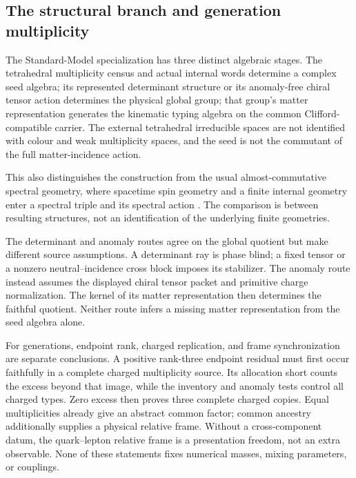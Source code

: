 \documentclass[11pt]{article}
\numberwithin{equation}{section}
\theoremstyle{definition}
\theoremstyle{remark}
\begin{document}
\subsection{The structural branch and generation multiplicity}

The Standard-Model specialization has three distinct algebraic stages.
The tetrahedral multiplicity census and actual internal words determine a
complex seed algebra; its represented determinant structure or its anomaly-free
chiral tensor action determines the physical global group; that group's
matter representation generates the kinematic typing algebra on the common
Clifford-compatible carrier.  The external tetrahedral irreducible spaces
are not identified with colour and weak multiplicity spaces, and the seed
is not the commutant of the full matter-incidence action.

This also distinguishes the construction from the usual almost-commutative
spectral geometry, where spacetime spin geometry and a finite internal
geometry enter a spectral triple and its spectral action
\cite{ConnesGravityMatter1996,ChamseddineConnes1997,
ChamseddineConnesMarcolli2007,ChamseddineConnes2008,
vanDenDungenVanSuijlekom2012}.  The comparison is between resulting
structures, not an identification of the underlying finite geometries.

The determinant and anomaly routes agree on the global quotient but make
different source assumptions.  A determinant ray is phase blind; a fixed
tensor or a nonzero neutral--incidence cross block imposes its stabilizer.
The anomaly route instead assumes the displayed chiral tensor packet and
primitive charge normalization.  The kernel of its matter representation
then determines the faithful quotient.  Neither route infers a missing
matter representation from the seed algebra alone.

For generations, endpoint rank, charged replication, and frame synchronization
are separate conclusions.  A positive rank-three endpoint residual must
first occur faithfully in a complete charged multiplicity source.  Its
allocation short counts the excess beyond that image, while the inventory
and anomaly tests control all charged types.  Zero excess then proves three
complete charged copies.  Equal multiplicities already give an abstract
common factor; common ancestry additionally supplies a physical relative
frame.  Without a cross-component datum, the quark--lepton relative frame is
a presentation freedom, not an extra observable.  None of these statements
fixes numerical masses, mixing parameters, or couplings.
\end{document}
